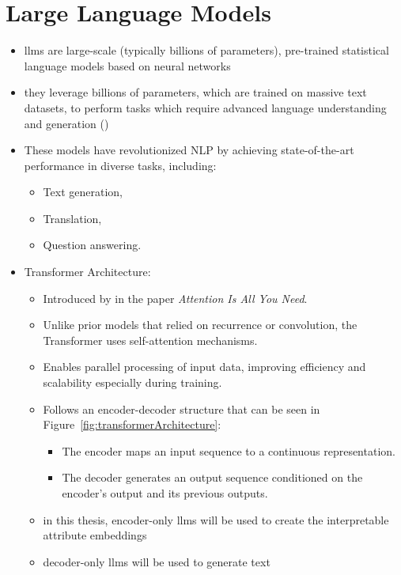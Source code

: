 \section{Large Language Models}
\label{sec:background:llm}
\begin{itemize}
  \item \Acfp{llm} are large-scale (typically billions of parameters), pre-trained statistical language models based on neural networks
  \item they leverage billions of parameters, which are trained on massive text datasets, to perform tasks which require advanced language understanding and generation (\cite{minaeeLargeLanguageModels2025})
  \item These models have revolutionized NLP by achieving state-of-the-art performance in diverse tasks, including:
        \begin{itemize}
          \item Text generation,
          \item Translation,
          \item Question answering.
        \end{itemize}
  \item Transformer Architecture:
        \begin{itemize}
          \item Introduced by \citet{NIPS2017_3f5ee243} in the paper \textit{Attention Is All You Need}.
          \item Unlike prior models that relied on recurrence or convolution, the Transformer uses self-attention mechanisms.
          \item Enables parallel processing of input data, improving efficiency and scalability especially during training.
          \item Follows an encoder-decoder structure that can be seen in Figure~\ref{fig:transformerArchitecture}:
                \begin{itemize}
                  \item The encoder maps an input sequence to a continuous representation.
                  \item The decoder generates an output sequence conditioned on the encoder's output and its previous outputs.
                \end{itemize}
          \item in this thesis, encoder-only \acp{llm} will be used to create the interpretable attribute embeddings
          \item decoder-only \acp{llm} will be used to generate text
        \end{itemize}
\end{itemize}




